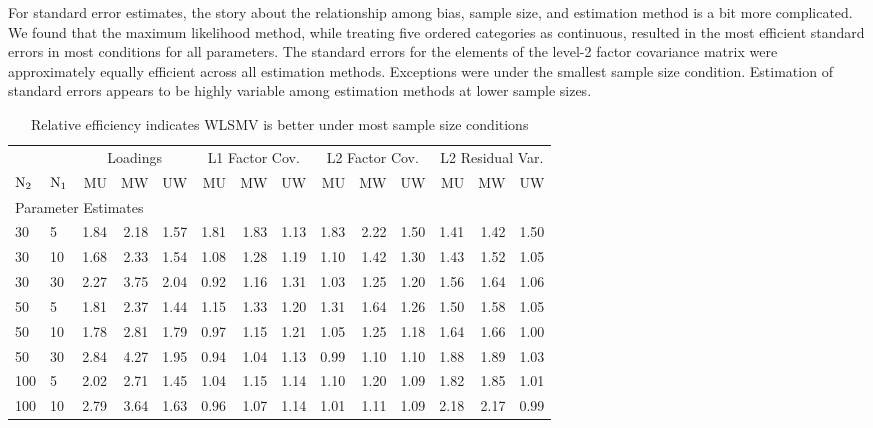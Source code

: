 \documentclass[man, noextraspace, 12pt]{apa7}
\begin{document}
For standard error estimates, the story about the relationship among bias, sample size, and estimation method is a bit more complicated.
We found that the maximum likelihood method, while treating five ordered categories as continuous, resulted in the most efficient standard errors in most conditions for all parameters.
The standard errors for the elements of the level-2 factor covariance matrix were approximately equally efficient across all estimation methods.
Exceptions were under the smallest sample size condition.
Estimation of standard errors appears to be highly variable among estimation methods at lower sample sizes.
\begin{table}[!htp]
 \centering
 \small
 \begin{threeparttable}
\caption{Relative efficiency indicates WLSMV is better under most sample size conditions} 
\label{tb:re}
\begin{tabular}{llrrrrrrrrrrrr}
  \toprule
  &     & \multicolumn{3}{c}{Loadings} & \multicolumn{3}{c}{L1 Factor Cov.} & \multicolumn{3}{c}{L2 Factor Cov.} & \multicolumn{3}{c}{L2 Residual Var.}\\  \cmidrule(lr){3-5} \cmidrule(lr){6-8} \cmidrule(lr){9-11} \cmidrule(lr){12-14}
$\rm N_2$ & $\rm N_1$ & MU & MW & UW & MU & MW & UW & MU & MW & UW & MU & MW & UW \\ 
  \midrule
\multicolumn{14}{l}{Parameter Estimates}\\
30 & 5 & 1.84 & 2.18 & 1.57 & 1.81 & 1.83 & 1.13 & 1.83 & 2.22 & 1.50 & 1.41 & 1.42 & 1.50 \\ 
  30 & 10 & 1.68 & 2.33 & 1.54 & 1.08 & 1.28 & 1.19 & 1.10 & 1.42 & 1.30 & 1.43 & 1.52 & 1.05 \\ 
  30 & 30 & 2.27 & 3.75 & 2.04 & 0.92 & 1.16 & 1.31 & 1.03 & 1.25 & 1.20 & 1.56 & 1.64 & 1.06 \\ 
  50 & 5 & 1.81 & 2.37 & 1.44 & 1.15 & 1.33 & 1.20 & 1.31 & 1.64 & 1.26 & 1.50 & 1.58 & 1.05 \\ 
  50 & 10 & 1.78 & 2.81 & 1.79 & 0.97 & 1.15 & 1.21 & 1.05 & 1.25 & 1.18 & 1.64 & 1.66 & 1.00 \\ 
  50 & 30 & 2.84 & 4.27 & 1.95 & 0.94 & 1.04 & 1.13 & 0.99 & 1.10 & 1.10 & 1.88 & 1.89 & 1.03 \\ 
  100 & 5 & 2.02 & 2.71 & 1.45 & 1.04 & 1.15 & 1.14 & 1.10 & 1.20 & 1.09 & 1.82 & 1.85 & 1.01 \\ 
  100 & 10 & 2.79 & 3.64 & 1.63 & 0.96 & 1.07 & 1.14 & 1.01 & 1.11 & 1.09 & 2.18 & 2.17 & 0.99 \\ 

\end{tabular}
\end{threeparttable}
\end{table}
\end{document}

